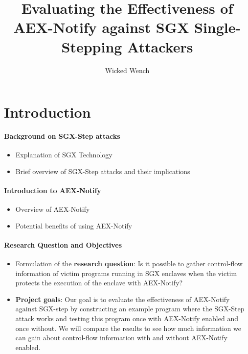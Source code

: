 \documentclass{llncs}
\title{Evaluating the Effectiveness of AEX-Notify against SGX Single-Stepping Attackers}
\author{Wicked Wench}
\institute{	University of L\"ubeck, Germany}
\begin{document}
\maketitle

%


\section{Introduction}

\paragraph{Background on SGX-Step attacks}
\begin{itemize}
  \item Explanation of SGX Technology 
  \item Brief overview of SGX-Step attacks and their implications
\end{itemize}

\paragraph{Introduction to AEX-Notify}
\begin{itemize}
  \item Overview of AEX-Notify
  \item Potential benefits of using AEX-Notify
\end{itemize}

\paragraph{Research Question and Objectives}
\begin{itemize}
  \item Formulation of the \textbf{research question}:
    Is it possible to gather control-flow information of victim programs running
    in SGX enclaves when the victim protects the execution of the enclave with
    AEX-Notify?
  \item \textbf{Project goals}:
    Our goal is to evaluate the effectiveness of AEX-Notify against SGX-step by
    constructing an example program where the SGX-Step attack works and testing
    this program once with AEX-Notify enabled and once without. We will compare
    the results to see how much information we can gain about control-flow
    information with and without AEX-Notify enabled.
\end{itemize}
\end{document}
